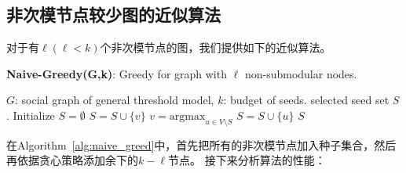 \subsection{非次模节点较少图的近似算法}
对于有$\ell (\ell<k)$个非次模节点的图，我们提供如下的近似算法。
\begin{algorithm}[h]
	\caption{\textbf{Naive-Greedy(G,k)}: Greedy for graph with $\ell$ non-submodular nodes.}
	\label{alg:naive_greed} 
	\begin{algorithmic}[1]
		\Require $G$: social graph of general threshold model, $k$: budget of seeds.
		\Ensure selected seed set $S$.
		\State Initialize $S = \emptyset$
			\State $S = S \cup \{v\}$
		\EndFor
			\State $v = \mathrm{argmax}_{u \in V \setminus S}$ 
			\State $S = S \cup \{u\}$
		\EndFor
		\State \Return $S$
	\end{algorithmic} 
\end{algorithm}
在Algorithm~\ref{alg:naive_greed}中，首先把所有的非次模节点加入种子集合，然后再依据贪心策略添加余下的$k - \ell$节点。
接下来分析算法的性能：


